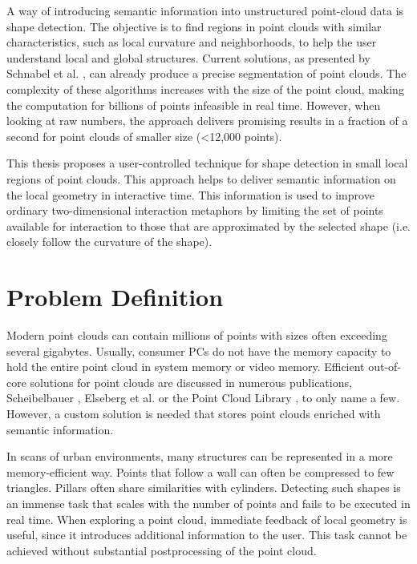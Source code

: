 \par

A way of introducing semantic information into unstructured point-cloud data is shape detection. The objective is to find regions in point clouds with similar characteristics, such as local curvature and neighborhoods, to help the user understand local and global structures. Current solutions, as presented by Schnabel et al. \cite{schnabel-2007-efficient, schnabel-2007-ransac}, can already produce a precise segmentation of point clouds. The complexity of these algorithms increases with the size of the point cloud, making the computation for billions of points infeasible in real time. However, when looking at raw numbers, the approach delivers promising results in a fraction of a second for point clouds of smaller size (<12,000 points).

\par

This thesis proposes a user-controlled technique for shape detection in small local regions of point clouds. This approach helps to deliver semantic information on the local geometry in interactive time. This information is used to improve ordinary two-dimensional interaction metaphors by limiting the set of points available for interaction to those that are approximated by the selected shape (i.e. closely follow the curvature of the shape). 


\section{Problem Definition}

Modern point clouds can contain millions of points with sizes often exceeding several gigabytes. Usually, consumer PCs do not have the memory capacity to hold the entire point cloud in system memory or video memory. Efficient out-of-core solutions for point clouds are discussed in numerous publications, Scheibelbauer \cite{scheiblauer-thesis}, Elseberg et al. \cite{elseberg2013one} or the Point Cloud Library \cite{rusu20113d}, to only name a few. However, a custom solution is needed that stores point clouds enriched with semantic information.

\par

In scans of urban environments, many structures can be represented in a more memory-efficient way. Points that follow a wall can often be compressed to few triangles. Pillars often share similarities with cylinders. Detecting such shapes is an immense task that scales with the number of points and fails to be executed in real time. When exploring a point cloud, immediate feedback of local geometry is useful, since it introduces additional information to the user. This task cannot be achieved without substantial postprocessing of the point cloud. 


